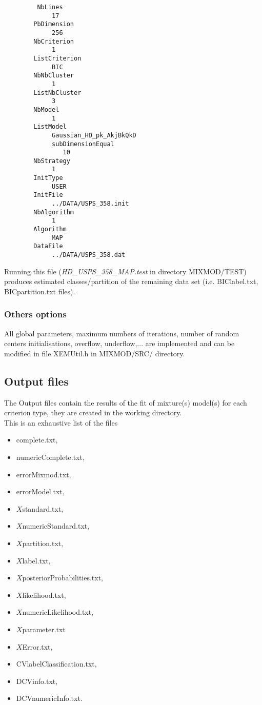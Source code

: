 {\scriptsize
  \begin{verbatim}
         NbLines
             17
        PbDimension
             256
        NbCriterion
             1
        ListCriterion
             BIC
        NbNbCluster
             1
        ListNbCluster
             3
        NbModel
             1
        ListModel
             Gaussian_HD_pk_AkjBkQkD
             subDimensionEqual
                10
        NbStrategy
             1
        InitType
             USER
        InitFile
             ../DATA/USPS_358.init
        NbAlgorithm
             1
        Algorithm
             MAP
        DataFile
             ../DATA/USPS_358.dat
  \end{verbatim}
}






Running this file ({\it HD\_USPS\_358\_MAP.test} in directory MIXMOD/TEST) produces
estimated classes/partition of the remaining data set (i.e. BIClabel.txt, BICpartition.txt files).

\subsubsection{Others options}
\label{output}
All global parameters, maximum numbers of iterations, number of random
centers initialisations, overflow, underflow,... are implemented and
can be modified in file XEMUtil.h in MIXMOD/SRC/ directory.

\subsection{Output files}
The Output files contain the results of the fit of mixture(s)
model(s) for each criterion type, they are created in the working directory.\\
This is an exhaustive list of the files
\begin{itemize}
 \item complete.txt,
 \item numericComplete.txt,
 \item errorMixmod.txt,
 \item errorModel.txt,
 \item $X$standard.txt,
 \item $X$numericStandard.txt,
 \item $X$partition.txt,
 \item $X$label.txt,
 \item $X$posteriorProbabilities.txt,
 \item $X$likelihood.txt,
 \item $X$numericLikelihood.txt,
 \item $X$parameter.txt
 \item $X$Error.txt,
 \item CVlabelClassification.txt,
 \item DCVinfo.txt,
 \item DCVnumericInfo.txt.
\end{itemize}

